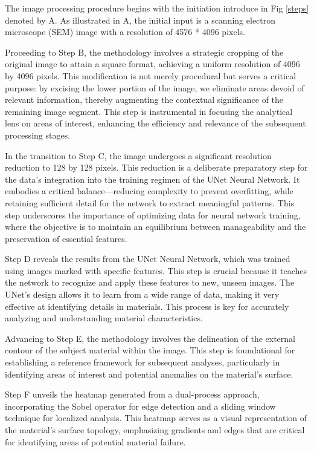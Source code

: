 \documentclass[preprint,12pt]{elsarticle}
\begin{document}
The image processing procedure begins with the initiation introduce in Fig \ref{steps} denoted by A. As illustrated in A, the initial input is a scanning electron microscope (SEM) image with a resolution of 4576 * 4096 pixels.


Proceeding to Step B, the methodology involves a strategic cropping of the original image to attain a square format, achieving a uniform resolution of 4096 by 4096 pixels. This modification is not merely procedural but serves a critical purpose: by excising the lower portion of the image, we eliminate areas devoid of relevant information, thereby augmenting the contextual significance of the remaining image segment. This step is instrumental in focusing the analytical lens on areas of interest, enhancing the efficiency and relevance of the subsequent processing stages.


In the transition to Step C, the image undergoes a significant resolution reduction to 128 by 128 pixels. This reduction is a deliberate preparatory step for the data's integration into the training regimen of the UNet Neural Network. It embodies a critical balance—reducing complexity to prevent overfitting, while retaining sufficient detail for the network to extract meaningful patterns. This step underscores the importance of optimizing data for neural network training, where the objective is to maintain an equilibrium between manageability and the preservation of essential features.


Step D reveals the results from the UNet Neural Network, which was trained using images marked with specific features. This step is crucial because it teaches the network to recognize and apply these features to new, unseen images. The UNet's design allows it to learn from a wide range of data, making it very effective at identifying details in materials. This process is key for accurately analyzing and understanding material characteristics.


Advancing to Step E, the methodology involves the delineation of the external contour of the subject material within the image. This step is foundational for establishing a reference framework for subsequent analyses, particularly in identifying areas of interest and potential anomalies on the material's surface.


Step F unveils the heatmap generated from a dual-process approach, incorporating the Sobel operator for edge detection and a sliding window technique for localized analysis. This heatmap serves as a visual representation of the material's surface topology, emphasizing gradients and edges that are critical for identifying areas of potential material failure.
\end{document}
